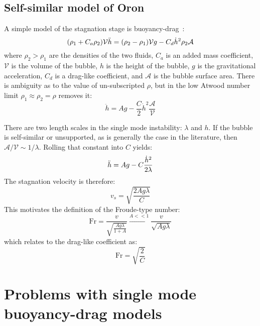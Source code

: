 \subsection{Self-similar model of Oron}

A simple model of the stagnation stage is buoyancy-drag~\cite{Oron2001}:
\begin{equation} \elabel{buoyancy_drag}
(\rho_1 + C_a \rho_2) \mathcal{V} \ddot{h} = (\rho_2 - \rho_1) \mathcal{V} g - C_d \dot{h}^2 \rho_2 \mathcal{A}
\end{equation}
where $\rho_2 > \rho_1$ are the densities of the two fluids, 
$C_a$ is an added mass coefficient,
$\mathcal{V}$ is the volume of the bubble, 
$h$ is the height of the bubble,
$g$ is the gravitational acceleration,
$C_d$ is a drag-like coefficient, and
$\mathcal{A}$ is the bubble surface area.
There is ambiguity as to the value of un-subscripted $\rho$, but in the low Atwood number limit $\rho_1 \approx \rho_2 = \rho$ removes it:
\begin{equation}
\ddot{h} = A g - \frac{C}{2} \dot{h}^2 \frac{\mathcal{A}}{\mathcal{V}}
\end{equation}

There are two length scales in the single mode instability: $\lambda$ and $h$.
If the bubble is self-similar or unsupported, as is generally the case in the literature, then $\mathcal{A}/\mathcal{V} \sim 1/\lambda$.
Rolling that constant into $C$ yields:
\begin{equation} \elabel{bouancy_drag}
\ddot{h} = A g - C \frac{\dot{h}^2}{2 \lambda}  
\end{equation}
The stagnation velocity is therefore:
\begin{equation}
v_s = \sqrt{\frac{2 A g \lambda}{C}}
\end{equation}
This motivates the definition of the Froude-type number:
\begin{equation}
\text{Fr} = \frac{v}{\sqrt{\frac{A g \lambda}{1+A}}} \xrightarrow{A << 1} \frac{v}{\sqrt{A g \lambda}}
\end{equation}
which relates to the drag-like coefficient as:
\begin{equation}
\text{Fr} = \sqrt{\frac{2}{C}}
\end{equation}


\section{Problems with single mode buoyancy-drag models}

